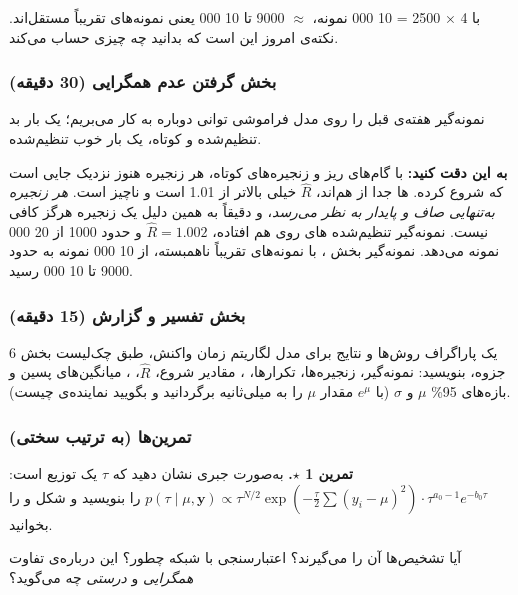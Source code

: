 با 4 × 2500 = 10 000 نمونه،  \ensuremath{\approx} 9000 تا 10 000 یعنی نمونه‌های
 تقریباً مستقل‌اند. نکته‌ی امروز این است که بدانید چه چیزی حساب
می‌کند.

\subsubsection{\texorpdfstring{بخش  گرفتن عدم همگرایی (30
دقیقه)}{بخش D: گرفتن عدم همگرایی (30 دقیقه)}}

نمونه‌گیر  هفته‌ی قبل را روی مدل فراموشی توانی دوباره به
کار می‌بریم؛ یک بار بد تنظیم‌شده و کوتاه، یک بار خوب تنظیم‌شده.

\textbf{به این دقت کنید:} با گام‌های ریز و زنجیره‌های کوتاه، هر زنجیره
هنوز نزدیک جایی است که شروع کرده. ها جدا از هم‌اند، \(\hat R\)
خیلی بالاتر از 1.01 است و  ناچیز است. \emph{هر زنجیره به‌تنهایی
صاف و پایدار به نظر می‌رسد}، و دقیقاً به همین دلیل یک زنجیره هرگز کافی
نیست. نمونه‌گیر تنظیم‌شده های روی هم افتاده، \(\hat R = 1.002\)
و  حدود 1000 از 20 000 نمونه می‌دهد. نمونه‌گیر  بخش
، با نمونه‌های تقریباً ناهمبسته، از 10 000 نمونه به  حدود
9000 تا 10 000 رسید.

\subsubsection{\texorpdfstring{بخش  تفسیر و گزارش (15
دقیقه)}{بخش E: تفسیر و گزارش (15 دقیقه)}}

یک پاراگراف روش‌ها و نتایج  برای مدل لگاریتم زمان واکنش، طبق
چک‌لیست بخش 6 جزوه، بنویسید: نمونه‌گیر، زنجیره‌ها، تکرارها، ،
مقادیر شروع، \(\hat R\)، ، میانگین‌های پسین و بازه‌های 95\%
\(\mu\) و \(\sigma\) (با \(e^\mu\) مقدار \(\mu\) را به میلی‌ثانیه
برگردانید و بگویید نماینده‌ی چیست).

\subsubsection{تمرین‌ها (به ترتیب سختی)}

\textbf{تمرین 1 \ensuremath{\star}.} به‌صورت جبری نشان دهید که 
\(\tau\) یک توزیع  است:
\(p(\tau\mid\mu,\mathbf{y}) \propto \tau^{N/2}\exp(-\tfrac{\tau}{2}\sum(y_i-\mu)^2)\cdot\tau^{a_0-1}e^{-b_0\tau}\)
را بنویسید و شکل و  را بخوانید.

آیا تشخیص‌ها آن را می‌گیرند؟ اعتبارسنجی با شبکه چطور؟ این درباره‌ی تفاوت
\emph{همگرایی} و \emph{درستی} چه می‌گوید؟

